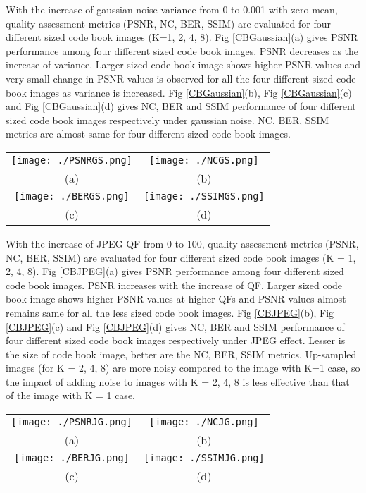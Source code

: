 With the increase of gaussian noise variance from 0 to 0.001 with zero mean, quality assessment metrics (PSNR, NC, BER, SSIM) are evaluated for four different sized code book images (K=1, 2, 4, 8). Fig \ref{CBGaussian}(a) gives PSNR performance among four different sized code book images. PSNR decreases as the increase of variance. Larger sized code book image shows higher PSNR values and very small change in PSNR values is observed for all the four different sized code book images as variance is increased. Fig \ref{CBGaussian}(b), Fig \ref{CBGaussian}(c) and Fig \ref{CBGaussian}(d) gives NC, BER and SSIM performance of four different sized code book images respectively under gaussian noise. NC, BER, SSIM metrics are almost same for four different sized code book images.  \\

\begin{figure*}
\begin{tabular}{cc}
\texttt{[image: ./PSNRGS.png]}&\texttt{[image: ./NCGS.png]}\\
(a)  & (b) \\
\texttt{[image: ./BERGS.png]}&\texttt{[image: ./SSIMGS.png]}\\
(c)   & (d)
\end{tabular}
\caption{(a) PSNR Vs Variance, (b) NC Vs Variance,  (c) BER Vs Variance,  (d) SSIM Vs Variance }
\label{CBGaussian}
\end{figure*} 

With the increase of JPEG QF from 0 to 100, quality assessment metrics (PSNR, NC, BER, SSIM) are evaluated for four different sized code book images (K = 1, 2, 4, 8). Fig \ref{CBJPEG}(a) gives PSNR performance among four different sized code book images. PSNR increases with the increase of QF. Larger sized code book image shows higher PSNR values at higher QFs and PSNR values almost remains same for all the less sized  code book images. Fig \ref{CBJPEG}(b), Fig \ref{CBJPEG}(c) and Fig \ref{CBJPEG}(d) gives NC, BER and SSIM performance of four different sized code book images respectively under JPEG effect. Lesser is the size of code book image, better are the NC, BER, SSIM metrics. Up-sampled images (for K = 2, 4, 8) are more noisy compared to the image with K=1 case, so the impact of adding noise to images with K = 2, 4, 8 is less effective than that of the image with K = 1 case. \\

\begin{figure*}
\begin{tabular}{cc}
\texttt{[image: ./PSNRJG.png]}&\texttt{[image: ./NCJG.png]}\\
(a)  & (b) \\
\texttt{[image: ./BERJG.png]}&\texttt{[image: ./SSIMJG.png]}\\
(c)   & (d)
\end{tabular}
\caption{(a) PSNR Vs QF, (b) NC Vs QF,  (c) BER Vs QF,  (d) SSIM Vs QF }
\label{CBJPEG}
\end{figure*}

